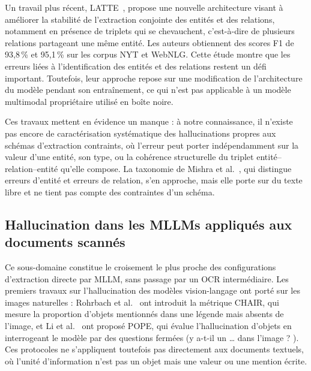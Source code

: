 Un travail plus récent, LATTE~\cite{zhang2026latte}, propose une nouvelle architecture visant à améliorer la stabilité de l'extraction conjointe des entités et des relations, notamment en présence de triplets qui se chevauchent, c'est-à-dire de plusieurs relations partageant une même entité. Les auteurs obtiennent des scores F1 de 93,8\,\% et 95,1\,\% sur les corpus NYT et WebNLG. Cette étude montre que les erreurs liées à l'identification des entités et des relations restent un défi important. Toutefois, leur approche repose sur une modification de l'architecture du modèle pendant son entraînement, ce qui n'est pas applicable à un modèle multimodal propriétaire utilisé en boîte noire.

Ces travaux mettent en évidence un manque : à notre connaissance, il n'existe pas encore de caractérisation systématique des hallucinations propres aux schémas d'extraction contraints, où l'erreur peut porter indépendamment sur la valeur d'une entité, son type, ou la cohérence structurelle du triplet entité--relation--entité qu'elle compose. La taxonomie de Mishra et al.~\cite{mishra2024fava}, qui distingue erreurs d'entité et erreurs de relation, s'en approche, mais elle porte sur du texte libre et ne tient pas compte des contraintes d'un schéma.

\subsection{Hallucination dans les MLLMs appliqués aux documents scannés}

Ce sous-domaine constitue le croisement le plus proche des configurations d'extraction directe par MLLM, sans passage par un OCR intermédiaire. Les premiers travaux sur l'hallucination des modèles vision-langage ont porté sur les images naturelles : Rohrbach et al.~\cite{rohrbach2018chair} ont introduit la métrique CHAIR, qui mesure la proportion d'objets mentionnés dans une légende mais absents de l'image, et Li et al.~\cite{li2023pope} ont proposé POPE, qui évalue l'hallucination d'objets en interrogeant le modèle par des questions fermées (\og y a-t-il un \ldots{} dans l'image ? \fg{}). Ces protocoles ne s'appliquent toutefois pas directement aux documents textuels, où l'unité d'information n'est pas un objet mais une valeur ou une mention écrite.


